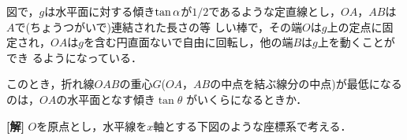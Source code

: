 \documentclass[a4j]{jarticle}
\begin{document}

\preEqlabel{$\cdots$}
     \begin{oframed}
     図で，$g$は水平面に対する傾き$\tan\alpha$が$1/2$であるような定直線とし，$OA$，$AB$は$A$で(ちょうつがいで)連結された長さの等
     しい棒で，その端$O$は$g$上の定点に固定され，$OA$は$g$を含む円直面ないで自由に回転し，他の端$B$は$g$上を動くことができ
     るようになっている．
     
     このとき，折れ線$OAB$の重心$G$($OA$，$AB$の中点を結ぶ線分の中点)が最低になるのは，$OA$の水平面となす傾き$\tan\theta$
     がいくらになるときか．
     \end{oframed}

\setlength{\columnseprule}{0.4pt}
\begin{multicols}{2}
{\bf[解]} \1 $O$を原点とし，水平線を$x$軸とする下図のような座標系で考える．

     \begin{minipage}{0.5\hsize}
          \begin{center}
          \scalebox{.4}{}
          \end{center}
     \end{minipage}
     \begin{minipage}{0.5\hsize}
         \begin{center}
          \scalebox{.5}{}
          \end{center}
     \end{minipage}
     

\end{multicols}
\end{document}
